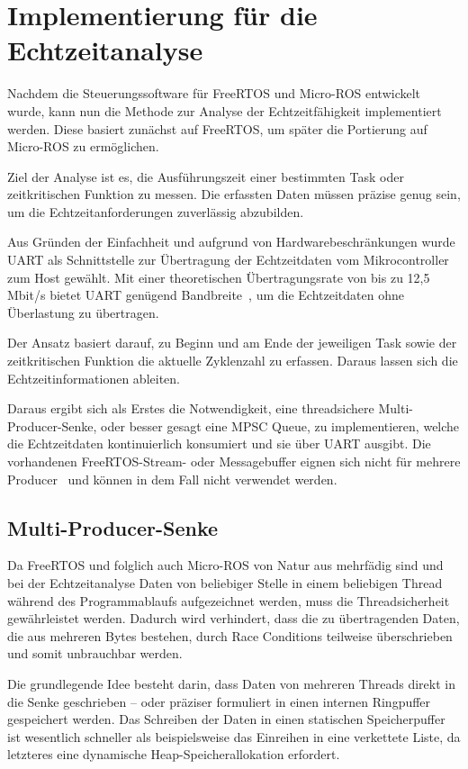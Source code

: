 \section{Implementierung für die Echtzeitanalyse}

Nachdem die Steuerungssoftware für FreeRTOS und Micro-ROS entwickelt wurde, kann
nun die Methode zur Analyse der Echtzeitfähigkeit implementiert werden. Diese
basiert zunächst auf FreeRTOS, um später die Portierung auf Micro-ROS zu
ermöglichen.

Ziel der Analyse ist es, die Ausführungszeit einer bestimmten Task oder
zeitkritischen Funktion zu messen. Die erfassten Daten müssen präzise genug
sein, um die Echtzeitanforderungen zuverlässig abzubilden.

Aus Gründen der Einfachheit und aufgrund von Hardwarebeschränkungen wurde UART
als Schnittstelle zur Übertragung der Echtzeitdaten vom Mikrocontroller zum Host
gewählt. Mit einer theoretischen Übertragungsrate von bis zu 12,5 Mbit/s bietet
UART genügend Bandbreite~\cite[S. 2]{stm32_datasheet}, um die Echtzeitdaten
ohne Überlastung zu übertragen.

Der Ansatz basiert darauf, zu Beginn und am Ende der jeweiligen Task sowie der
zeitkritischen Funktion die aktuelle Zyklenzahl zu erfassen. Daraus lassen sich
die Echtzeitinformationen ableiten.

Daraus ergibt sich als Erstes die Notwendigkeit, eine threadsichere
Multi-Producer-Senke, oder besser gesagt eine \ac{MPSC} Queue, zu
implementieren, welche die Echtzeitdaten kontinuierlich konsumiert und sie über
UART ausgibt. Die vorhandenen FreeRTOS-Stream- oder Messagebuffer eignen sich
nicht für mehrere Producer~\cite{FreeRTOSStreamBuffer} und können in dem Fall
nicht verwendet werden.

\subsection{Multi-Producer-Senke}

Da FreeRTOS und folglich auch Micro-ROS von Natur aus mehrfädig sind und bei der
Echtzeitanalyse Daten von beliebiger Stelle in einem beliebigen Thread während
des Programmablaufs aufgezeichnet werden, muss die Threadsicherheit
gewährleistet werden. Dadurch wird verhindert, dass die zu übertragenden Daten,
die aus mehreren Bytes bestehen, durch Race Conditions teilweise überschrieben
und somit unbrauchbar werden.

Die grundlegende Idee besteht darin, dass Daten von mehreren Threads direkt in
die Senke geschrieben -- oder präziser formuliert in einen internen Ringpuffer
gespeichert werden. Das Schreiben der Daten in einen statischen Speicherpuffer
ist wesentlich schneller als beispielsweise das Einreihen in eine verkettete
Liste, da letzteres eine dynamische Heap-Speicherallokation erfordert.

